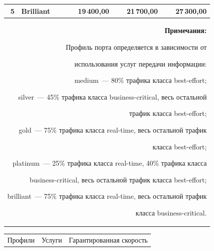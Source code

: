 \begin{table}
\begin{center}
\begin{tabular}{|r|l|r|r|r|}
5&{Brilliant}&19\,400,00 & 21\,700,00 & 27\,300,00\\


\hline


\multicolumn{5}{p{96mm}}{\footnotesize \textbf{Примечания:}


Профиль порта определяется в зависимости от 


использования услуг передачи информации:


{medium}~--- 80\% трафика класса best-effort;


{silver}~--- 45\% трафика класса business-critical, весь остальной 


трафик класса best-effort;


{gold}~--- 75\% трафика класса real-time, весь остальной трафик 


класса best-effort;


{platinum}~--- 25\% трафика класса real-time, 40\% трафика класса 


business-critical, весь остальной трафик класса best-effort;


{brilliant}~--- 75\% трафика класса real-time, весь остальной трафик 


класса business-critical.}


\end{tabular}


\end{center}






\vspace*{-6pt}


\begin{center}




\vspace*{2ex}





\tabcolsep=11pt


\begin{tabular}{|l|l|r|r|r|}


\hline


\multicolumn{1}{|c|}{Профили }&\multicolumn{1}{c|}{Услуги}


&\multicolumn{3}{c|}{Гарантированная скорость}\\



\end{tabular}
\end{center}
\end{table}
